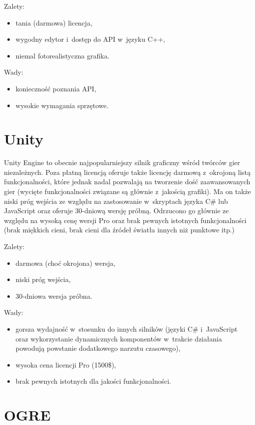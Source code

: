 {\raggedright Zalety:
\begin{itemize}
\item tania (darmowa) licencja,
\item wygodny edytor i~dostęp do API w~języku C++,
\item niemal fotorealistyczna grafika.
\end{itemize}

Wady:
\begin{itemize}
\item konieczność poznania API,
\item wysokie wymagania sprzętowe.
\end{itemize}
}
\section{Unity}

Unity Engine to obecnie najpopularniejszy silnik graficzny wśród twórców gier niezależnych. Poza płatną licencją oferuje także licencję darmową z~okrojoną listą funkcjonalności, które jednak nadal pozwalają na tworzenie dość zaawansowanych gier (wycięte funkcjonalności związane są głównie z~jakością grafiki). Ma on także niski próg wejścia ze względu na zastosowanie w~skryptach języka C\# lub JavaScript oraz oferuje 30-dniową wersję próbną. Odrzucono go głównie ze względu na wysoką cenę wersji Pro oraz brak pewnych istotnych funkcjonalności (brak miękkich cieni, brak cieni dla źródeł światła innych niż punktowe itp.)\\

{\raggedright Zalety:
\begin{itemize}
\item darmowa (choć okrojona) wersja,
\item niski próg wejścia,
\item 30-dniowa wersja próbna.
\end{itemize}

Wady:
\begin{itemize}
\item gorsza wydajność w~stosunku do innych silników (języki C\# i~JavaScript oraz wykorzystanie dynamicznych komponentów w~trakcie działania powodują powstanie dodatkowego narzutu czasowego),
\item wysoka cena licencji Pro (1500\$),
\item brak pewnych istotnych dla jakości funkcjonalności.
\end{itemize}
}
\section{OGRE}


